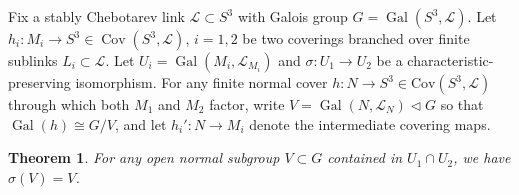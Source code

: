 \documentclass{amsart}
\theoremstyle{plain}
\newtheorem{theorem}{Theorem}[section]
\theoremstyle{definition}
\theoremstyle{plain}
\theoremstyle{plain}
\theoremstyle{plain}
\theoremstyle{remark}
\theoremstyle{remark}
\theoremstyle{plain}
\theoremstyle{definition}
\theoremstyle{plain}
\DeclareMathOperator{\Gal}{\mathrm{Gal}}
\DeclareMathOperator{\Cov}{\mathrm{Cov}}
\theoremstyle{plain}
\theoremstyle{plain}
\numberwithin{equation}{section}
\begin{document}
\medskip

Fix a stably Chebotarev link $\mathcal{L} \subset S^3$ with Galois group $G = \Gal(S^3, \mathcal{L})$. Let $h_i: M_i \to S^3 \in \Cov(S^3, \mathcal{L})$, $i = 1, 2$ be two coverings branched over finite sublinks $L_i \subset \mathcal{L}$. Let $U_i = \Gal(M_i, \mathcal{L}_{M_i})$ and $\sigma: U_1 \to U_2$ be a characteristic-preserving isomorphism. For any finite normal cover $h: N \to S^3 \in \mathrm{Cov}(S^3, \mathcal{L})$ through which both $M_1$ and $M_2$ factor, write $V = \Gal(N, \mathcal{L}_N) \triangleleft G$ so that $\Gal(h) \cong G/V$, and let $h_i': N \to M_i$ denote the intermediate covering maps. 


\begin{theorem}\label{thm:sigmaV}
For any open normal subgroup $V \subset G$ contained in $U_1 \cap U_2$, we have $\sigma(V) = V$.
\end{theorem}
\end{document}
